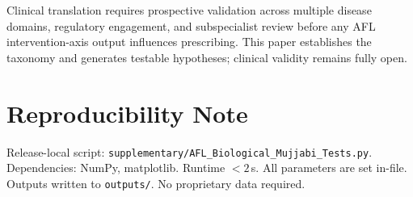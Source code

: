 \documentclass[12pt,a4paper]{article}
\begin{document}
Clinical translation requires prospective validation across multiple disease domains, regulatory engagement, and subspecialist review before any AFL intervention-axis output influences prescribing. This paper establishes the taxonomy and generates testable hypotheses; clinical validity remains fully open.

\section{Reproducibility Note}

Release-local script: \texttt{supplementary/AFL\_Biological\_Mujjabi\_Tests.py}. Dependencies: NumPy, matplotlib. Runtime $< 2$\,s. All parameters are set in-file. Outputs written to \texttt{outputs/}. No proprietary data required.




\end{document}
